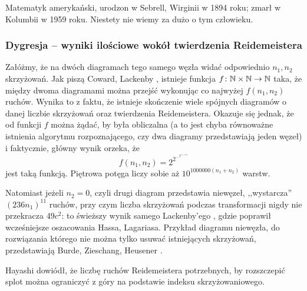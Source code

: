 \begin{remark}
    Matematyk amerykański, urodzon w Sebrell, Wirginii w 1894 roku; zmarł w Kolumbii w 1959 roku.
    Niestety nie wiemy za dużo o tym człowieku.
\end{remark}

\color{white}

\subsubsection{Dygresja -- wyniki ilościowe wokół twierdzenia Reidemeistera}
Załóżmy, że na dwóch diagramach tego samego węzła widać odpowiednio $n_1, n_2$ skrzyżowań.
Jak piszą Coward, Lackenby \cite{coward2011}, istnieje funkcja $f \colon \mathbb N \times \mathbb N \to \mathbb N$ taka, że między dwoma diagramami można przejść wykonując co najwyżej $f(n_1, n_2)$ ruchów.
%
%
Wynika to z faktu, że istnieje skończenie wiele spójnych diagramów o danej liczbie skrzyżowań oraz twierdzenia Reidemeistera.
Okazuje się jednak, że od funkcji $f$ można żądać, by była obliczalna
(a to jest chyba równoważne istnienia algorytmu rozpoznającego, czy dwa diagramy przedstawiają jeden węzeł)
i faktycznie, główny wynik \cite{coward2011} orzeka, że
\begin{equation}
    f(n_1, n_2) = 2^{2^{\ldots^{2^{n_1 + n_2}}}}
\end{equation}
jest taką funkcją.
Piętrowa potęga liczy sobie aż $10^{1000000 (n_1 + n_2)}$ warstw.

Natomiast jeżeli $n_2 = 0$, czyli drugi diagram przedstawia niewęzeł, ,,wystarcza'' $(236n_1)^{11}$ ruchów, przy czym liczba skrzyżowań podczas transformacji nigdy nie przekracza $49c^2$: to świeższy wynik samego Lackenby'ego \cite{lackenby2015}, gdzie poprawił wcześniejsze oszacowania Hassa, Lagariasa.
Przykład diagramu niewęzła, do rozwiązania którego nie można tylko usuwać istniejących skrzyżowań, przedstawiają Burde, Zieschang, Heusener \cite[s. 12]{burde2014}.

Hayashi \cite{hayashi2005} dowiódł, że liczbę ruchów Reidemeistera potrzebnych, by rozszczepić splot można ograniczyć z góry na podstawie indeksu skrzyżowaniowego.
%


